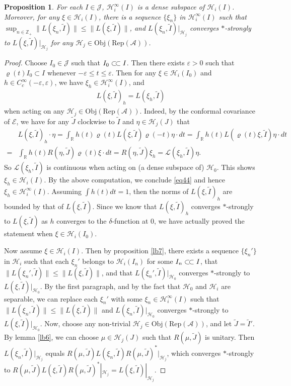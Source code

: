 \documentclass[12pt,a4paper]{article}
\theoremstyle{definition}
\theoremstyle{plain}
\newtheorem{pp}[df]{Proposition}
\newcommand{\mc}{\mathcal}
\newcommand{\wtd}{\widetilde}
\newcommand{\scr}{\mathscr}
\newcommand{\RepA}{\mathrm{Rep}(\mc A)}
\newcommand{\mbb}{\mathbb}
\newcommand{\Obj}{\mathrm{Obj}}
\numberwithin{equation}{subsection}
\begin{document}
\begin{pp}\label{lb8}
For each $I\in\mc J$, $\mc H_i^\infty(I)$ is a dense subspace of $\mc H_i(I)$. Moreover, for any $\xi\in\mc H_i(I)$, there is a sequence $\{\xi_n\}$ in $\mc H_i^\infty(I)$ such that $\sup_{n\in\mbb Z_+}\big\lVert  L(\xi_n,\wtd I) \big\lVert\leq\big\lVert  L(\xi,\wtd I) \big\lVert$,  and $L(\xi_n,\wtd I)|_{\mc H_j}$ converges $*$-strongly to $L(\xi,\wtd I)|_{\mc H_j}$ for any $\mc H_j\in\Obj(\RepA)$.
\end{pp}

\begin{proof}
Choose  $I_0\in\mc J$ such that $I_0\subset\joinrel\subset I$. Then there exists $\varepsilon>0$ such that $\varrho(t)I_0\subset I$ whenever $-\varepsilon\leq t\leq \varepsilon$. Then for any $\xi\in\mc H_i(I_0)$ and $h\in C_c^\infty(-\varepsilon,\varepsilon)$,  we have $\xi_h\in\mc H_i^\infty(I)$, and
\begin{align}
L(\xi,\wtd I)_h=L(\xi_h,\wtd I)\label{eq44}
\end{align}
when acting on any $\mc H_j\in\Obj(\RepA)$. Indeed, by the conformal covariance of $\scr E$, we have for any $\wtd J$ clockwise to $\wtd I$ and $\eta\in\mc H_j(J)$ that
\begin{align*}
&L(\xi,\wtd I)_h\cdot \eta=\int_{\mbb R}h(t)\varrho(t)L(\xi,\wtd I)\varrho(-t)\eta\cdot dt=\int_{\mbb R}h(t)L(\varrho(t)\xi,\wtd I)\eta\cdot dt\\
=&\int_{\mbb R}h(t)R(\eta,\wtd J)\varrho(t)\xi\cdot dt=R(\eta,\wtd J)\xi_h=\scr L(\xi_h,\wtd I)\eta.
\end{align*}
So $\scr L(\xi_h,\wtd I)$ is continuous when acting on (a dense subspace of) $\mc H_0$. This shows $\xi_h\in\mc H_i(I)$. By the above computation, we conclude \eqref{eq44} and hence $\xi_h\in\mc H_i^\infty(I)$. Assuming $\int h(t)dt=1$, then the norms of $L(\xi,\wtd I)_h$ are bounded by that of $L(\xi,\wtd I)$. Since we know that $L(\xi,\wtd I)_h$ converges $*$-strongly to $L(\xi,\wtd I)$ as $h$ converges to the $\delta$-function at $0$, we have actually proved the statement when $\xi\in\mc H_i(I_0)$.

Now assume $\xi\in\mc H_i(I)$. Then by proposition \ref{lb7}, there exists a sequence $\{\xi_n'\}$ in $\mc H_i$ such that each $\xi_n'$ belongs to $\mc H_i(I_n)$ for some $I_n\subset\joinrel\subset I$, that $\lVert L(\xi_n',\wtd I) \lVert\leq \lVert L(\xi,\wtd I) \lVert$, and that $L(\xi_n',\wtd I)|_{\mc H_0}$ converges $*$-strongly to $L(\xi,\wtd I)|_{\mc H_0}$. By the first paragraph,  and by the fact that $\mc H_0$ and $\mc H_i$ are separable, we can replace each $\xi_n'$ with some $\xi_n\in\mc H_i^\infty(I)$ such that $\lVert L(\xi_n,\wtd I) \lVert\leq \lVert L(\xi,\wtd I) \lVert$ and $L(\xi_n,\wtd I)|_{\mc H_0}$ converges $*$-strongly to $L(\xi,\wtd I)|_{\mc H_0}$. Now, choose any non-trivial $\mc H_j\in\Obj(\RepA)$, and let $\wtd J=\wtd I'$. By lemma \ref{lb6}, we can choose $\mu\in\mc H_j(J)$ such that $R(\mu,\wtd J)$ is unitary. Then $L(\xi_n,\wtd I)|_{\mc H_j}$ equals $R(\mu,\wtd J)L(\xi_n,\wtd I)R(\mu,\wtd J)^*|_{\mc H_j}$, which converges $*$-strongly to $R(\mu,\wtd J)L(\xi,\wtd I)R(\mu,\wtd J)^*|_{\mc H_j}=L(\xi,\wtd I)|_{\mc H_j}$.
\end{proof}	
\end{document}
